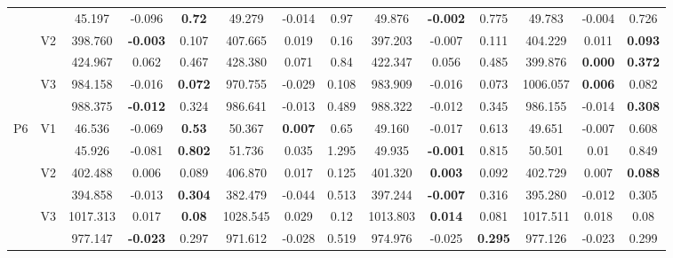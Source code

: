 \documentclass[12pt,a4paper]{article}
\begin{document}
\begin{sidewaystable}[ht]
{\begin{tabular}{cc|ccc|ccc|ccc|ccc|}
   &  & 45.197 & -0.096 & \textbf{0.72} & 49.279 & -0.014 & 0.97 & 49.876 & \textbf{-0.002} & 0.775 & 49.783 & -0.004 & 0.726 \\ 
   & \multirow{2}{*}{V2} & 398.760 & \textbf{-0.003} & 0.107 & 407.665 & 0.019 & 0.16 & 397.203 & -0.007 & 0.111 & 404.229 & 0.011 & \textbf{0.093} \\ 
   &  & 424.967 & 0.062 & 0.467 & 428.380 & 0.071 & 0.84 & 422.347 & 0.056 & 0.485 & 399.876 & \textbf{0.000} & \textbf{0.372} \\ 
   & \multirow{2}{*}{V3} & 984.158 & -0.016 & \textbf{0.072} & 970.755 & -0.029 & 0.108 & 983.909 & -0.016 & 0.073 & 1006.057 & \textbf{0.006} & 0.082 \\ 
   &  & 988.375 & \textbf{-0.012} & 0.324 & 986.641 & -0.013 & 0.489 & 988.322 & -0.012 & 0.345 & 986.155 & -0.014 & \textbf{0.308} \\ 
   \hline \hline\multirow{6}{*}{P6} & \multirow{2}{*}{V1} & 46.536 & -0.069 & \textbf{0.53} & 50.367 & \textbf{0.007} & 0.65 & 49.160 & -0.017 & 0.613 & 49.651 & -0.007 & 0.608 \\ 
   &  & 45.926 & -0.081 & \textbf{0.802} & 51.736 & 0.035 & 1.295 & 49.935 & \textbf{-0.001} & 0.815 & 50.501 & 0.01 & 0.849 \\ 
   & \multirow{2}{*}{V2} & 402.488 & 0.006 & 0.089 & 406.870 & 0.017 & 0.125 & 401.320 & \textbf{0.003} & 0.092 & 402.729 & 0.007 & \textbf{0.088} \\ 
   &  & 394.858 & -0.013 & \textbf{0.304} & 382.479 & -0.044 & 0.513 & 397.244 & \textbf{-0.007} & 0.316 & 395.280 & -0.012 & 0.305 \\ 
   & \multirow{2}{*}{V3} & 1017.313 & 0.017 & \textbf{0.08} & 1028.545 & 0.029 & 0.12 & 1013.803 & \textbf{0.014} & 0.081 & 1017.511 & 0.018 & 0.08 \\ 
   &  & 977.147 & \textbf{-0.023} & 0.297 & 971.612 & -0.028 & 0.519 & 974.976 & -0.025 & \textbf{0.295} & 977.126 & -0.023 & 0.299 \\ 
   \hline
\end{tabular}
}
\end{sidewaystable}
\end{document}
